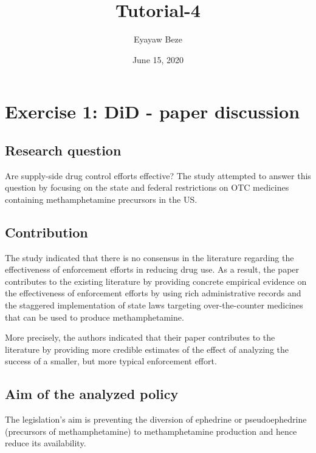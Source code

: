 \documentclass[
  11pt,
]{article}
\title{Tutorial-4}
\author{Eyayaw Beze}
\date{June 15, 2020}
\begin{document}
\maketitle

\hypertarget{exercise-1-did---paper-discussion}{%
\section{Exercise 1: DiD - paper
discussion}\label{exercise-1-did---paper-discussion}}

\hypertarget{research-question}{%
\subsection*{Research question}\label{research-question}}

Are supply-side drug control efforts effective? The study attempted to
answer this question by focusing on the state and federal restrictions
on OTC medicines containing methamphetamine precursors in the US.

\hypertarget{contribution}{%
\subsection*{Contribution}\label{contribution}}

The study indicated that there is no consensus in the literature
regarding the effectiveness of enforcement efforts in reducing drug use.
As a result, the paper contributes to the existing literature by
providing concrete empirical evidence on the effectiveness of
enforcement efforts by using rich administrative records and the
staggered implementation of state laws targeting over-the-counter
medicines that can be used to produce methamphetamine.

More precisely, the authors indicated that their paper contributes to
the literature by providing more credible estimates of the effect of
analyzing the success of a smaller, but more typical enforcement effort.

\hypertarget{aim-of-the-analyzed-policy}{%
\subsection*{Aim of the analyzed
policy}\label{aim-of-the-analyzed-policy}}

The legislation's aim is preventing the diversion of ephedrine or
pseudoephedrine (precursors of methamphetamine) to methamphetamine
production and hence reduce its availability.
\end{document}
